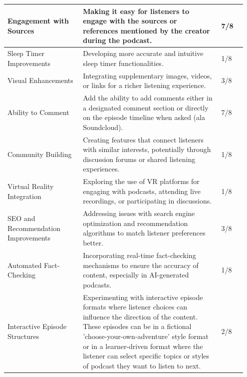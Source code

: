 \documentclass[12pt]{report}
\begin{document}
\begin{myfont}
\begin{longtable}{p{0.3\linewidth} | p{0.55\linewidth} | p{0.1\linewidth} }
            \midrule
            Engagement with Sources & Making it easy for listeners to engage with the sources or references mentioned by the creator during the podcast. & 7/8 \\
            \midrule
            Sleep Timer Improvements & Developing more accurate and intuitive sleep timer functionalities. & 1/8\\
            \midrule
            Visual Enhancements & Integrating supplementary images, videos, or links for a richer listening experience. & 3/8\\
            \midrule
            Ability to Comment & Add the ability to add comments either in a designated comment section or directly on the episode timeline when asked (ala Soundcloud). & 7/8\\
            \midrule
            Community Building & Creating features that connect listeners with similar interests, potentially through discussion forums or shared listening experiences. & 1/8\\
            \midrule
            Virtual Reality Integration & Exploring the use of VR platforms for engaging with podcasts, attending live recordings, or participating in discussions. & 1/8\\
            \midrule
            SEO and Recommendation Improvements & Addressing issues with search engine optimization and recommendation algorithms to match listener preferences better. & 3/8\\
            \midrule
            Automated Fact-Checking &  Incorporating real-time fact-checking mechanisms to ensure the accuracy of content, especially in AI-generated podcasts. & 1/8 \\
            \midrule
            Interactive Episode Structures & Experimenting with interactive episode formats where listener choices can influence the direction of the content. These episodes can be in a fictional 'choose-your-own-adventure' style format or in a learner-driven format where the listener can select specific topics or styles of podcast they want to listen to next. & 2/8\\
            \bottomrule
        \end{longtable}
        

\end{myfont}
\end{document}
